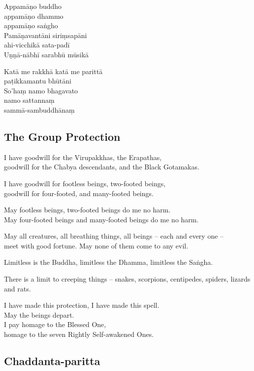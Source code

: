 
Appamāṇo buddho\\\vin appamāṇo dhammo\\\vin appamāṇo saṅgho\\
Pamāṇavantāni siriṃsapāni\\\vin ahi-vicchikā sata-padī\\
Uṇṇā-nābhī sarabhū mūsikā

Katā me rakkhā katā me parittā\\\vin paṭikkamantu bhūtāni\\
So'haṃ namo bhagavato\\\vin namo sattannaṃ\\\vin sammā-sambuddhānaṃ



\subsection{The Group Protection}

I have goodwill for the Virupakkhas, the Erapathas,\\
goodwill for the Chabya descendants, and the Black Gotamakas.

I have goodwill for footless beings, two-footed beings,\\
goodwill for four-footed, and many-footed beings.

May footless beings, two-footed beings do me no harm.\\
May four-footed beings and many-footed beings do me no harm.

May all creatures, all breathing things, all beings -- each and every one --\\
meet with good fortune. May none of them come to any evil.

Limitless is the Buddha, limitless the Dhamma, limitless the Saṅgha.

There is a limit to creeping things -- snakes, scorpions, centipedes, spiders,
lizards and rats.

I have made this protection, I have made this spell.\\
May the beings depart.\\
I pay homage to the Blessed One,\\
homage to the seven Rightly Self-awakened Ones.

\subsection{Chaddanta-paritta}
\label{vadhissamenanti}

